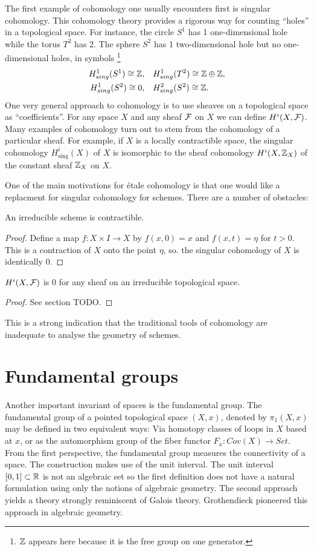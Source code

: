 The first example of cohomology one usually encounters first is singular cohomology. This cohomology theory provides a rigorous way for counting ``holes'' in a topological space.  For instance, the circle $S^1$ has 1 one-dimensional hole while the torus $T^2$ has 2. The sphere $S^2$ has 1 two-dimensional hole but no one-dimensional holes, in symbols 
\footnote{$\mathbb{Z}$ appears here because it is the free group on one generator.}
\begin{align*}
  H^1_{sing}(S^1) \cong \mathbb{Z},\quad &H^1_{sing}(T^2) \cong \mathbb{Z} \oplus \mathbb{Z},\\
  H^1_{sing}(S^2) \cong  0,\quad &H^2_{sing}(S^2) \cong \mathbb{Z}.
\end{align*}
One very general approach to cohomology is to use sheaves on a topological space as ``coefficients''. For any space $X$ and any sheaf $\mathcal{F}$ on $X$ we can define $H^i(X, \mathcal{F})$. Many examples of cohomology turn out to stem from the cohomology of a particular sheaf. For example, if $X$ is a locally contractible space, the singular cohomology $H_{\text{sing}}^i(X)$ of $X$ is isomorphic to the sheaf cohomology $H^i(X, \mathbb{Z}_X)$ of the constant sheaf $\mathbb{Z}_X$ on $X$.

One of the main motivations for \'etale cohomology is that one would like a replacment for singular cohomology for schemes. There are a number of obstacles:
\begin{proposition}\label{scheme_contractible}
    An irreducible scheme is contractible.
\end{proposition}
\begin{proof}
  Define a map $f: X \times I \to X$  by $f(x,0) = x$ and $f(x,t) = \eta$ for $t > 0$. This is a contraction of $X$ onto the point $\eta$, so. the singular cohomology of $X$ is identically 0.
\end{proof}

\begin{proposition}
  $H^i(X, \mathcal{F})$ is 0 for any sheaf on an irreducible topological space.
\end{proposition}
\begin{proof}
    See section TODO.
\end{proof}
This is a strong indication that the traditional tools of cohomology are inadequate to analyse the geometry of schemes.


\section{Fundamental groups}
Another important invariant of spaces is the fundamental group. The fundamental group of a pointed topological space $(X,x)$, denoted by $\pi_1(X,x)$ may be defined in two equivalent ways: Via homotopy classes of loops in $X$ based at $x$, or as the automorphism group of the fiber functor $F_x: Cov(X) \to Set$. From the first perspective, the fundamental group measures the connectivity of a space. The construction makes use of the unit interval. The unit interval $[0,1] \subset \mathbb{R}$ is not an algebraic set so the first definition does not have a natural formulation using only the notions of algebraic geometry. The second approach yields a theory strongly reminiscent of Galois theory. Grothendieck pioneered this approach in algebraic geometry.

